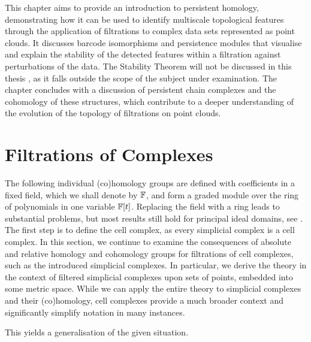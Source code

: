 \label{PersistentHomology}
This chapter aims to provide an introduction to persistent homology, demonstrating how it can be used to identify multiscale topological features through the application of filtrations to complex data sets represented as point clouds. It discusses barcode isomorphisms and persistence modules that visualise and explain the stability of the detected features within a filtration against perturbations of the data. 
The Stability Theorem will not be discussed in this thesis \cite[Theorem 4.20]{chazal2016structure}, as it falls outside the scope of the subject under examination. The chapter concludes with a discussion of persistent chain complexes and the cohomology of these structures, which contribute to a deeper understanding of the evolution of the topology of filtrations on point clouds.

\section{Filtrations of Complexes}
\label{FiltrationsofComplexes}
The following individual (co)homology groups are defined with coefficients in a fixed field, which we shall denote by ${\mathbb{F}}$, and form a graded module over the ring of polynomials in one variable ${\mathbb{F}}[t]$. Replacing the field with a ring leads to substantial problems, but most results still hold for principal ideal domains, see \cite[Theorem 2.1, \S 3.1]{zomorodian2004computing}. The first step is to define the cell complex, as every simplicial complex is a cell complex. In this section, we continue to examine the consequences of absolute and relative homology and cohomology groups for filtrations of cell complexes, such as the introduced simplicial complexes. In particular, we derive the theory in the context of filtered simplicial complexes upon sets of points, embedded into some metric space. While we can apply the entire theory to simplicial complexes and their (co)homology, cell complexes provide a much broader context and significantly simplify notation in many instances.

This yields a generalisation of the given situation.

